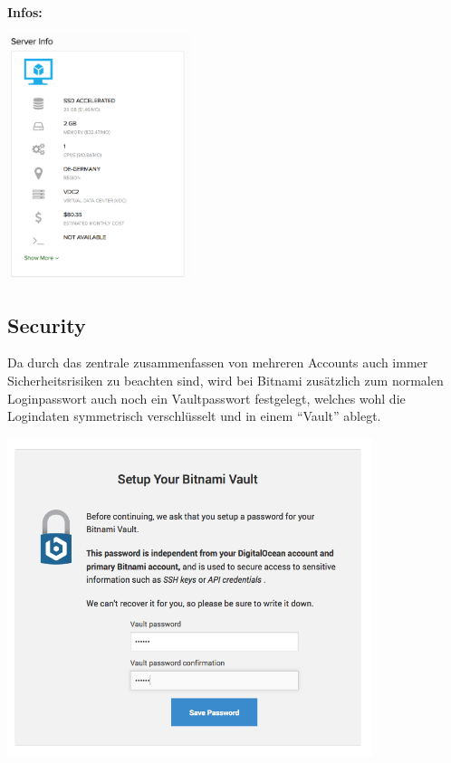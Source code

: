 \textbf{Infos:}

\includegraphics[width=0.4\textwidth]{./03_Analyse/03_Bitnami/images/vmware_infos}

\subsection{Security}
Da durch das zentrale zusammenfassen von mehreren Accounts auch immer 
Sicherheitsrisiken zu beachten sind, wird bei Bitnami zusätzlich zum normalen 
Loginpasswort auch noch ein Vaultpasswort festgelegt, welches wohl die 
Logindaten symmetrisch verschlüsselt und in einem ``Vault'' ablegt.

\includegraphics[width=0.8\textwidth]{./03_Analyse/03_Bitnami/images/bitnami_security}

